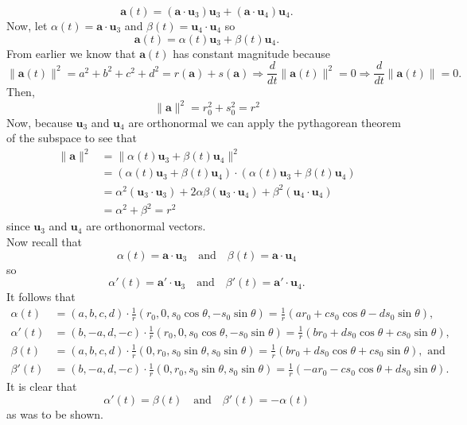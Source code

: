 \documentclass{exam}
\begin{document}
\begin{questions}
\begin{solution}
        \[
            \mathbf{a}(t) = (\mathbf{a} \cdot \mathbf{u}_3)\mathbf{u}_3 + (\mathbf{a} \cdot \mathbf{u}_4)\mathbf{u}_4.
        \]
        Now, let $\alpha(t) = \mathbf{a} \cdot \mathbf{u}_3$ and $\beta(t) = \mathbf{u}_4 \cdot \mathbf{u}_4$ so 
        \[
            \mathbf{a}(t) = \alpha(t)\mathbf{u}_3 + \beta(t)\mathbf{u}_4.
        \]
        From earlier we know that $\mathbf{a}(t)$ has constant magnitude because
        \[
            \| \mathbf{a}(t) \|^2 = a^2 + b^2 + c^2 + d^2 = r(\mathbf{a}) + s(\mathbf{a}) \Rightarrow \frac{d}{dt} \| \mathbf{a}(t) \|^2 = 0 \Rightarrow \frac{d}{dt} \| \mathbf{a}(t)\| = 0.
        \]
        Then, 
        \[
            \| \mathbf{a} \|^2  = r_0^2 + s_0^2 = r^2
        \]
        Now, because $\mathbf{u}_3$ and $\mathbf{u}_4$ are orthonormal we can apply the pythagorean theorem of the subspace to see that 
        \begin{align*}
            \|\mathbf{a}\|^2 &= \|\alpha(t)\mathbf{u}_3 + \beta(t)\mathbf{u}_4\|^2 \\
            &= (\alpha(t)\mathbf{u}_3 + \beta(t)\mathbf{u}_4) \cdot (\alpha(t)\mathbf{u}_3 + \beta(t)\mathbf{u}_4) \\
            &= \alpha^2(\mathbf{u}_3 \cdot \mathbf{u}_3) + 2\alpha\beta(\mathbf{u}_3 \cdot \mathbf{u}_4) + \beta^2(\mathbf{u}_4 \cdot \mathbf{u}_4) \\
            &= \alpha^2 + \beta^2 = r^2
        \end{align*}
        since $\mathbf{u}_3$ and $\mathbf{u}_4$ are orthonormal vectors. \\
        Now recall that 
        \[
            \alpha(t) = \mathbf{a} \cdot \mathbf{u}_3 \quad\text{and}\quad \beta(t) = \mathbf{a} \cdot \mathbf{u}_4
        \]
        so 
        \[
            \alpha'(t) = \mathbf{a}' \cdot \mathbf{u}_3 \quad\text{and}\quad \beta'(t) = \mathbf{a}' \cdot \mathbf{u}_4.
        \]
        It follows that 
        \begin{align*}
            \alpha(t) &= (a, b, c, d) \cdot \frac{1}{r}(r_0, 0, s_0\cos\theta, -s_0\sin\theta) = \frac{1}{r}(ar_0 + cs_0\cos\theta - ds_0\sin\theta), \\
            \alpha'(t) &= (b, -a, d, -c) \cdot \frac{1}{r}(r_0, 0, s_0\cos\theta, -s_0\sin\theta) = \frac{1}{r}(br_0 + ds_0\cos\theta + cs_0\sin\theta), \\
            \beta(t) &= (a, b, c, d) \cdot \frac{1}{r}(0, r_0, s_0\sin\theta, s_0\sin\theta) = \frac{1}{r}(br_0 + ds_0\cos\theta + cs_0\sin\theta), \text{ and}\\
            \beta'(t) &= (b, -a, d, -c) \cdot \frac{1}{r}(0, r_0, s_0\sin\theta, s_0\sin\theta) = \frac{1}{r}(-ar_0 - cs_0\cos\theta + ds_0\sin\theta).
        \end{align*}
        It is clear that 
        \[
            \alpha'(t) = \beta(t) \quad\text{and}\quad \beta'(t) = -\alpha(t)
        \]
        as was to be shown.
    \end{solution}


\end{questions}
\end{document}
